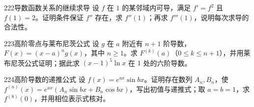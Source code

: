 \begin{exercise}{222}{导数函数关系的继续求导}
设 $f$ 在 $1$ 的某邻域内可导，满足 $f'=f^2$ 且 $f(1)=2$。证明条件保证 $f''$ 存在，求 $f''(1)$；再求 $f'''(1)$，说明每次求导的合法性。
\end{exercise}
\begin{exercise}{223}{高阶零点与莱布尼茨公式}
设 $g$ 在 $a$ 附近有 $n+1$ 阶导数，$F(x)=(x-a)^ng(x)$，其中 $n\ge1$。求 $F^{(k)}(a)$（$0\le k\le n+1$），并用莱布尼茨公式证明；据此求 $(x-1)^5\ln x$ 在 $1$ 处的六阶导数。
\end{exercise}
\begin{exercise}{224}{高阶导数的递推公式}
设 $f(x)=e^{ax}\sin bx$。证明存在数列 $A_n,B_n$，使 $f^{(n)}(x)=e^{ax}(A_n\sin bx+B_n\cos bx)$，写出初值与递推式；取 $a=b=1$，求 $f^{(8)}(0)$，并用相位表示式核对。
\end{exercise}
